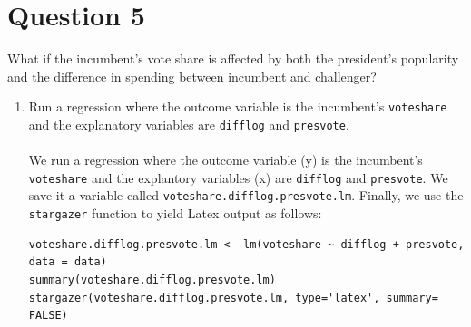 \documentclass[12pt,letterpaper]{article}
\begin{document}
\section*{Question 5}
\noindent What if the incumbent's vote share is affected by both the president's popularity and the difference in spending between incumbent and challenger? 
	\begin{enumerate}
		\item Run a regression where the outcome variable is the incumbent's \texttt{voteshare} and the explanatory variables are \texttt{difflog} and \texttt{presvote}.	
\\\\
\noindent We run a regression where the outcome variable (y) is the incumbent's \texttt{voteshare} and the explantory variables (x) are \texttt{difflog} and \texttt{presvote}. We save it a variable called \texttt{voteshare.difflog.presvote.lm}. Finally, we use the \texttt{stargazer} function to yield Latex output as follows:
\begin{lstlisting}
voteshare.difflog.presvote.lm <- lm(voteshare ~ difflog + presvote, data = data)
summary(voteshare.difflog.presvote.lm)
stargazer(voteshare.difflog.presvote.lm, type='latex', summary= FALSE)
\end{lstlisting}


\end{enumerate}
\end{document}
